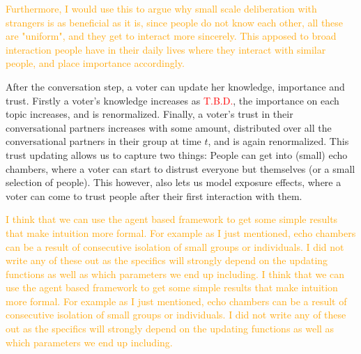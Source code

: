 \textcolor{orange}{
	Furthermore, I would use this to argue why small scale deliberation with strangers is as beneficial as it is, since people do not know each other, all these are "uniform", and they get to interact more sincerely. This apposed to broad interaction people have in their daily lives where they interact with similar people, and place importance accordingly.
}

After the conversation step, a voter can update her knowledge, importance and trust. Firstly a voter's knowledge increases as \textcolor{red}{T.B.D.}, the importance on each topic increases, and is renormalized. Finally, a voter's trust in their conversational partners increases with some amount, distributed over all the conversational partners in their group at time $t$, and is again renormalized. This trust updating allows us to capture two things: People can get into (small) echo chambers, where a voter can start to distrust everyone but themselves (or a small selection of people). This however, also lets us model exposure effects, where a voter can come to trust people after their first interaction with them.

\textcolor{orange}{
	I think that we can use the agent based framework to get some simple results that make intuition more formal. For example as I just mentioned, echo chambers can be a result of consecutive isolation of small groups or individuals. I did not write any of these out as the specifics will strongly depend on the updating functions as well as which parameters we end up including.
}
	\textcolor{orange}{ I think that we can use the agent based framework
		to get some simple results that make intuition more formal. For
		example as I just mentioned, echo chambers can be a result of
		consecutive isolation of small groups or individuals. I did not
		write any of these out as the specifics will strongly depend on
		the updating functions as well as which parameters we end up
		including. }

